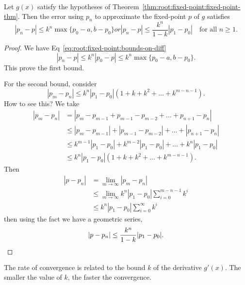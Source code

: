 \begin{cor}
  Let $g(x)$ satisfy the hypotheses of Theorem~\ref{thm:root:fixed-point:fixed-point-thm}. 
  Then the error using $p_{n}$ to approximate the fixed-point $p$ of $g$
  satisfies
  \begin{subequations}
    \begin{equation}
      |p_{n}-p| \leq k^{n}\max\{p_{0}-a,b-p_{0}\}
    \end{equation}
    or
    \begin{equation}
      |p_{n}-p|\leq\frac{k^{n}}{1-k}|p_{1}-p_{0}|\quad\mbox{for all }n\geq1.
    \end{equation}
  \end{subequations}
\end{cor}
\begin{proof}
  We have Eq~\eqref{eq:root:fixed-point:bounds-on-diff}
  \begin{equation}
    |p_{n}-p|\leq k^{n}|p_{0}-p|\leq k^{n}\max\{p_{0}-a,b-p_{0}\}.
  \end{equation}
  This prove the first bound.

  For the second bound, consider
  \begin{equation}
    |p_{m}-p_{n}|\leq k^{n} |p_{1}-p_{0}| (1 + k + k^{2} + \dots + k^{m-n-1}).
  \end{equation}
  How to see this? We take
  \begin{subequations}
    \begin{align}
    |p_{m}-p_{n}| &=
    |p_{m}-p_{m-1}+p_{m-1}-p_{m-2}+\dots+p_{n+1}-p_{n}|\\
    &\leq |p_{m}-p_{m-1}|+|p_{m-1}-p_{m-2}|+\dots+|p_{n+1}-p_{n}|\\
    &\leq k^{m-1}|p_{1}-p_{0}| + k^{m-2}|p_{1}-p_{0}| + \dots + k^{n}|p_{1}-p_{0}|\\
    &\leq k^{n}|p_{1}-p_{0}|(1 + k + k^{2} + \dots + k^{m-n-1}).
    \end{align}
  \end{subequations}
  Then
  \begin{subequations}
  \begin{align}
    |p - p_{n}| &= \lim_{m\to\infty}|p_{m}-p_{n}|\\
    &\leq\lim_{m\to\infty}k^{n}|p_{1}-p_{0}|\sum^{m-n-1}_{i=0}k^{i}\\
    &\leq k^{n}|p_{1}-p_{0}|\sum^{\infty}_{i=0}k^{i}
  \end{align}
  \end{subequations}
  then using the fact we have a geometric series,
  \begin{equation*}
    |p-p_{n}|\leq \frac{k^{n}}{1-k}|p_{1}-p_{0}|.\qedhere
  \end{equation*}
\end{proof}
\begin{rmk}
  The rate of convergence is related to the bound $k$ of the derivative
  $g'(x)$. The smaller the value of $k$, the faster the convergence.
\end{rmk}

